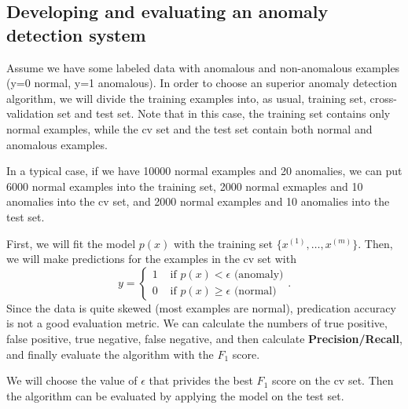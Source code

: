 \subsection{Developing and evaluating an anomaly detection system}
Assume we have some labeled data with anomalous and non-anomalous examples (y=0 normal, y=1 anomalous). In order to choose an superior anomaly detection algorithm, we will divide the training examples into, as usual, training set, cross-validation set and test set. Note that in this case, the training set contains only normal examples, while the cv set and the test set contain both normal and anomalous examples.

In a typical case, if we have 10000 normal examples and 20 anomalies, we can put 6000 normal examples into the training set, 2000 normal exmaples and 10 anomalies into the cv set, and 2000 normal examples and 10 anomalies into the test set.

First, we will fit the model $p(x)$ with the training set $\{x^{(1)},\dots,x^{(m)}\}$. Then, we will make predictions for the examples in the cv set with
\begin{equation}
y=\left\{
\begin{aligned}
1&\text{ if }p(x) < \epsilon\text{ (anomaly)}\\
0&\text{ if }p(x) \ge \epsilon\text{ (normal)}
\end{aligned}
\right..
\end{equation}
Since the data is quite skewed (most examples are normal), predication accuracy is not a good evaluation metric. We can calculate the numbers of true positive, false positive, true negative, false negative, and then calculate {\bf Precision/Recall}, and finally evaluate the algorithm with the $F_1$ score.

We will choose the value of $\epsilon$ that privides the best $F_1$ score on the cv set. Then the algorithm can be evaluated by applying the model on the test set.

